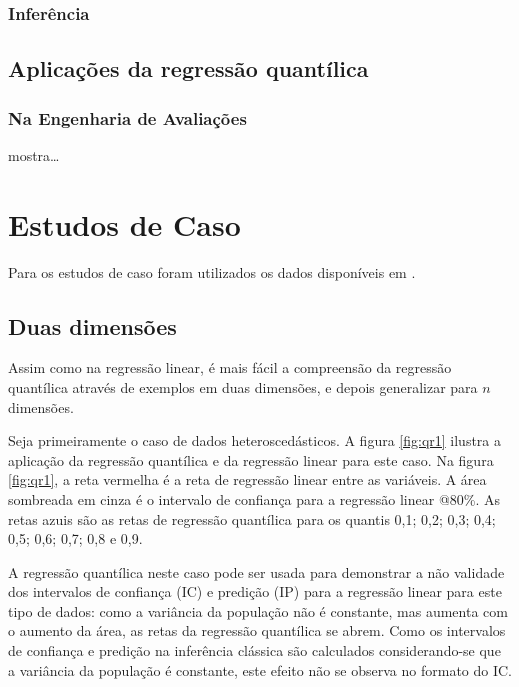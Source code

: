 \documentclass[a4paper, 12pt]{article}
\begin{document}
\hypertarget{inferencia}{%
\subsubsection{Inferência}\label{inferencia}}

\hypertarget{aplicacoes-da-regressao-quantilica}{%
\subsection{Aplicações da regressão
quantílica}\label{aplicacoes-da-regressao-quantilica}}

\hypertarget{na-engenharia-de-avaliacoes}{%
\subsubsection{Na Engenharia de
Avaliações}\label{na-engenharia-de-avaliacoes}}

\textcite{Zietz} mostra\ldots{}

\hypertarget{estudos-de-caso}{%
\section{Estudos de Caso}\label{estudos-de-caso}}

Para os estudos de caso foram utilizados os dados disponíveis em
\textcite{hochheim}.

\hypertarget{duas-dimensoes}{%
\subsection{Duas dimensões}\label{duas-dimensoes}}

Assim como na regressão linear, é mais fácil a compreensão da regressão
quantílica através de exemplos em duas dimensões, e depois generalizar
para \(n\) dimensões.

Seja primeiramente o caso de dados heteroscedásticos. A figura
\ref{fig:qr1} ilustra a aplicação da regressão quantílica e da regressão
linear para este caso. Na figura \ref{fig:qr1}, a reta vermelha é a reta
de regressão linear entre as variáveis. A área sombreada em cinza é o
intervalo de confiança para a regressão linear @80\%. As retas azuis são
as retas de regressão quantílica para os quantis 0,1; 0,2; 0,3; 0,4;
0,5; 0,6; 0,7; 0,8 e 0,9.

A regressão quantílica neste caso pode ser usada para demonstrar a não
validade dos intervalos de confiança (IC) e predição (IP) para a
regressão linear para este tipo de dados: como a variância da população
não é constante, mas aumenta com o aumento da área, as retas da
regressão quantílica se abrem. Como os intervalos de confiança e
predição na inferência clássica são calculados considerando-se que a
variância da população é constante, este efeito não se observa no
formato do IC.
\end{document}

